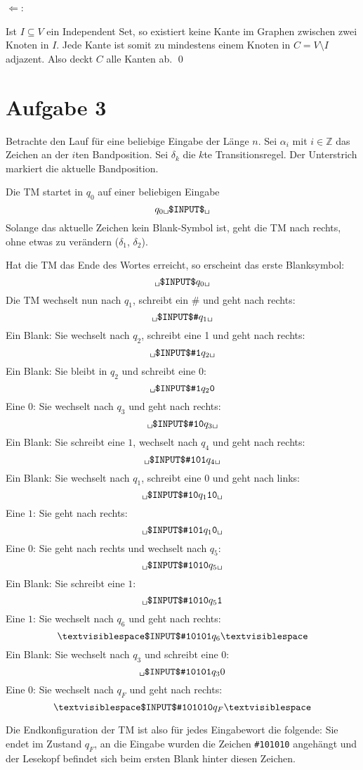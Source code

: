 \documentclass[a4paper]{article}
\newcommand{\tvs}{\textvisiblespace}
\begin{document}
$\Leftarrow$:

Ist $I \subseteq V$ ein Independent Set, so existiert keine Kante im Graphen zwischen zwei Knoten in $I$.
Jede Kante ist somit zu mindestens einem Knoten in $C = V \setminus I$ adjazent.
Also deckt $C$ alle Kanten ab.
\hfill{}\qed{}

\section{Aufgabe 3}

Betrachte den Lauf für eine beliebige Eingabe der Länge $n$.
Sei $\alpha_i$ mit $i \in \mathbb{Z}$ das Zeichen an der $i$ten Bandposition.
Sei $\delta_k$ die $k$te Transitionsregel.
Der Unterstrich markiert die aktuelle Bandposition.


Die TM startet in $q_0$ auf einer beliebigen Eingabe
\[ \texttt{$q_0$\tvs\$INPUT\$\tvs} \]
Solange das aktuelle Zeichen kein Blank-Symbol ist,
geht die TM nach rechts, ohne etwas zu verändern ($\delta_1$, $\delta_2$).

Hat die TM das Ende des Wortes erreicht, so erscheint das erste Blanksymbol:
\[ \texttt{\tvs\$INPUT\$$q_0$\tvs} \]
Die TM wechselt nun nach $q_1$, schreibt ein \# und geht nach rechts:
\[ \texttt{\tvs\$INPUT\$\#$q_1$\tvs} \]
Ein Blank: Sie wechselt nach $q_2$, schreibt eine 1 und geht nach rechts:
\[ \texttt{\tvs\$INPUT\$\#1$q_2$\tvs} \]
Ein Blank: Sie bleibt in $q_2$ und schreibt eine $0$:
\[ \texttt{\tvs\$INPUT\$\#1$q_2$0} \]
Eine $0$: Sie wechselt nach $q_3$ und geht nach rechts:
\[ \texttt{\tvs\$INPUT\$\#10$q_3$\tvs} \]
Ein Blank: Sie schreibt eine $1$, wechselt nach $q_4$ und geht nach rechts:
\[ \texttt{\tvs\$INPUT\$\#101$q_4$\tvs} \]
Ein Blank: Sie wechselt nach $q_1$, schreibt eine $0$ und geht nach links:
\[ \texttt{\tvs\$INPUT\$\#10$q_1$10\tvs} \]
Eine $1$: Sie geht nach rechts:
\[ \texttt{\tvs\$INPUT\$\#101$q_1$0\tvs} \]
Eine $0$: Sie geht nach rechts und wechselt nach $q_5$:
\[ \texttt{\tvs\$INPUT\$\#1010$q_5$\tvs} \]
Ein Blank: Sie schreibt eine $1$:
\[ \texttt{\tvs\$INPUT\$\#1010$q_5$1} \]
Eine $1$: Sie wechselt nach $q_6$ und geht nach rechts:
\[ \texttt{\tvs\$INPUT\$\#10101$q_6$}\tvs \]
Ein Blank: Sie wechselt nach $q_3$ und schreibt eine $0$:
\[ \texttt{\tvs\$INPUT\$\#10101$q_3$}0 \]
Eine $0$: Sie wechselt nach $q_F$ und geht nach rechts:
\[ \texttt{\tvs\$INPUT\$\#101010$q_F$}\tvs \]

Die Endkonfiguration der TM ist also für jedes Eingabewort die folgende:
Sie endet im Zustand $q_F$, an die Eingabe wurden die Zeichen
\texttt{\#101010} angehängt und der Lesekopf befindet sich beim ersten Blank
hinter diesen Zeichen.
\end{document}

